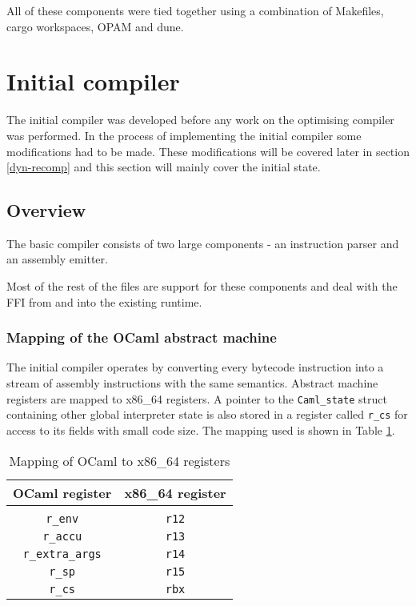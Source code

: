 All of these components were tied together using a combination of Makefiles, cargo workspaces, OPAM
and dune.

\section{Initial compiler}

The initial compiler was developed before any work on the optimising compiler was performed. In the
process of implementing the initial compiler some modifications had to be made. These modifications
will be covered later in section \ref{dyn-recomp} and this section will mainly cover the initial
state.

\subsection{Overview}

The basic compiler consists of two large components - an instruction parser and an assembly
emitter.

Most of the rest of the files are support for these components and deal with the FFI from and into
the existing runtime.

\subsubsection{Mapping of the OCaml abstract machine}

The initial compiler operates by converting every bytecode instruction into a stream of assembly
instructions with the same semantics. Abstract machine registers are mapped to x86\_64 registers. A
pointer to the \texttt{Caml\_state} struct containing other global interpreter state is also
stored in a register called \texttt{r\_cs} for access to its fields with small code size. The
mapping used is shown in Table \ref{table:regmap}.

\begin{table}[h]
      \centering
      \begin{tabular}{cc}\toprule
            OCaml register          & x86\_64 register \\
            \midrule                                   \\
            \texttt{r\_env}         & \texttt{r12}     \\
            \texttt{r\_accu}        & \texttt{r13}     \\
            \texttt{r\_extra\_args} & \texttt{r14}     \\
            \texttt{r\_sp}          & \texttt{r15}     \\
            \texttt{r\_cs}          & \texttt{rbx}     \\
            \bottomrule
      \end{tabular}

      \caption{Mapping of OCaml to x86\_64 registers}
      \label{table:regmap}
\end{table}


